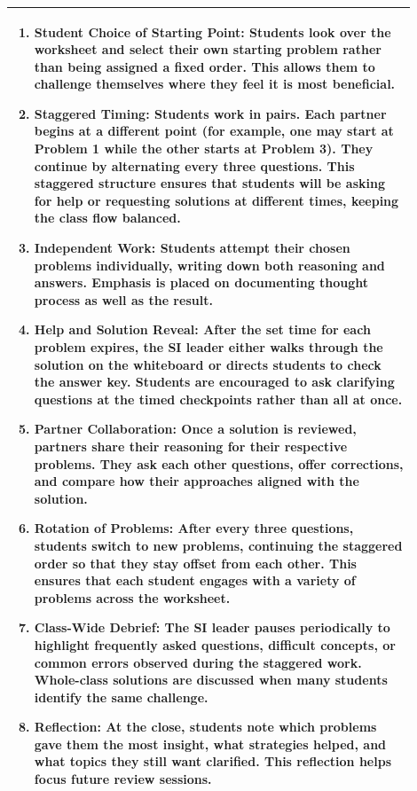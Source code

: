 \documentclass{article}
\begin{document}
{{\begin{tabular}{|p{0.9\linewidth}|}
\begin{enumerate}
    \item \textbf{Student Choice of Starting Point:} Students look over the worksheet and select their own starting problem rather than being assigned a fixed order. This allows them to challenge themselves where they feel it is most beneficial.
    
    \item \textbf{Staggered Timing:} Students work in pairs. Each partner begins at a different point (for example, one may start at Problem 1 while the other starts at Problem 3). They continue by alternating every three questions. This staggered structure ensures that students will be asking for help or requesting solutions at different times, keeping the class flow balanced.
    
    \item \textbf{Independent Work:} Students attempt their chosen problems individually, writing down both reasoning and answers. Emphasis is placed on documenting thought process as well as the result.
    
    \item \textbf{Help and Solution Reveal:} After the set time for each problem expires, the SI leader either walks through the solution on the whiteboard or directs students to check the answer key. Students are encouraged to ask clarifying questions at the timed checkpoints rather than all at once.
    
    \item \textbf{Partner Collaboration:} Once a solution is reviewed, partners share their reasoning for their respective problems. They ask each other questions, offer corrections, and compare how their approaches aligned with the solution.
    
    \item \textbf{Rotation of Problems:} After every three questions, students switch to new problems, continuing the staggered order so that they stay offset from each other. This ensures that each student engages with a variety of problems across the worksheet.
    
    \item \textbf{Class-Wide Debrief:} The SI leader pauses periodically to highlight frequently asked questions, difficult concepts, or common errors observed during the staggered work. Whole-class solutions are discussed when many students identify the same challenge.
    
    \item \textbf{Reflection:} At the close, students note which problems gave them the most insight, what strategies helped, and what topics they still want clarified. This reflection helps focus future review sessions.
\end{enumerate}\\
\hline
\end{tabular}
\newpage

}}
\end{document}

